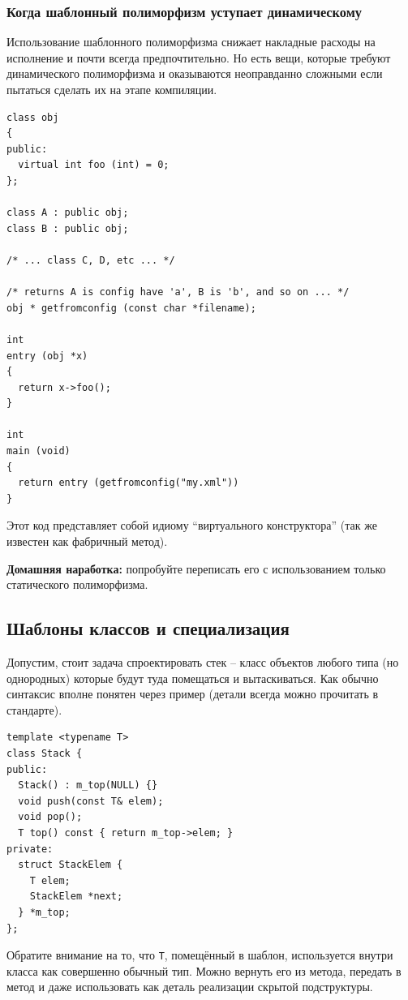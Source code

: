 \documentclass[a4paper,12pt,oneside]{article}
\begin{document}
\subsubsection{Когда шаблонный полиморфизм уступает динамическому}\label{DynamicBetterStatic}

Использование шаблонного полиморфизма снижает накладные расходы на исполнение и почти всегда предпочтительно. Но есть вещи, которые требуют динамического полиморфизма и оказываются неоправданно сложными если пытаться сделать их на этапе компиляции.

\begin{lstlisting}
class obj
{
public:
  virtual int foo (int) = 0;    
};

class A : public obj;
class B : public obj;

/* ... class C, D, etc ... */

/* returns A is config have 'a', B is 'b', and so on ... */
obj * getfromconfig (const char *filename);

int
entry (obj *x)
{
  return x->foo();
}

int
main (void)
{
  return entry (getfromconfig("my.xml"))
}
\end{lstlisting}

Этот код представляет собой идиому ``виртуального конструктора'' (так же известен как фабричный метод).

\textbf{Домашняя наработка:} попробуйте переписать его с использованием только статического полиморфизма.

\pagebreak
\subsection{Шаблоны классов и специализация}\label{ClassTemplates}

Допустим, стоит задача спроектировать стек – класс объектов любого типа (но однородных) которые будут туда помещаться и вытаскиваться. Как обычно синтаксис вполне понятен через пример (детали всегда можно прочитать в стандарте).

\begin{lstlisting}
template <typename T>
class Stack {
public:
  Stack() : m_top(NULL) {}
  void push(const T& elem);
  void pop();
  T top() const { return m_top->elem; }
private:
  struct StackElem {
    T elem;
    StackElem *next;
  } *m_top;
}; 
\end{lstlisting}

Обратите внимание на то, что \lstinline!T!, помещённый в шаблон, используется внутри класса как совершенно обычный тип. Можно вернуть его из метода, передать в метод и даже использовать как деталь реализации скрытой подструктуры.
\end{document}
